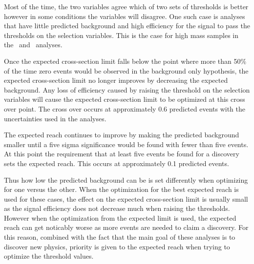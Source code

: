 Most of the time, the two variables agree which of two sets of thresholds is better however in some
conditions the variables will disagree. One such case is analyses that have little predicted background and high efficiency for the signal to pass the thresholds on the
selection variables. This is the case for high mass samples in the \tktof\  and \tkonly\ analyses.

Once the expected cross-section limit falls below the point where more than 50\% of the time zero events would be observed in the background only hypothesis,
the expected cross-section limit no longer improves
by decreasing the expected background. Any loss of efficiency caused by raising the threshold on the selection variables will cause the expected cross-section limit to be optimized
at this cross over point. The cross over occurs at approximately 0.6 predicted events with the uncertainties used in the analyses. 

The expected reach continues to improve by making the predicted background smaller until a five sigma significance would be found with fewer than five events. At this
point the requirement that at least five events be found for a discovery sets the expected reach.
This occurs at approximately 0.1 predicted events. 

Thus how low the predicted background can be is set differently when optimizing for one versus the other.
When the optimization for the best expected reach is used for these cases, the
effect on the expected cross-section limit is usually small as the signal efficiency does not decrease much when raising the thresholds. However
when the optimization from the expected limit is used, the expected reach can get noticably worse as more events are needed to claim a discovery.
For this reason, combined with the fact that the main goal of these analyses is to discover new physics, priority
is given to the expected reach when trying to optimize the threshold values.



